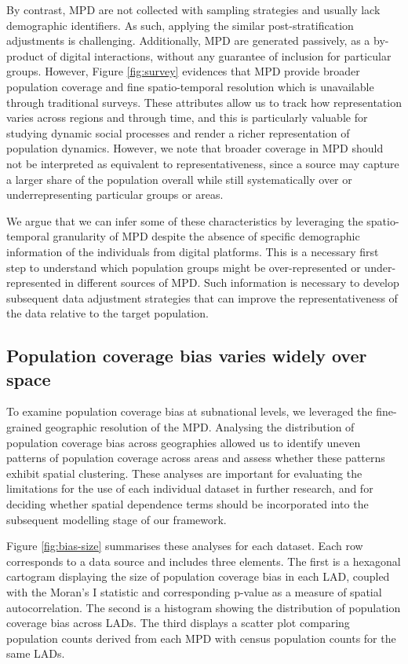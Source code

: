 \documentclass[]{rsos}%
\begin{document}
By contrast, MPD are not collected with sampling strategies and usually
lack demographic identifiers. As such, applying the similar
post-stratification adjustments is challenging. Additionally, MPD are
generated passively, as a by-product of digital interactions, without
any guarantee of inclusion for particular groups. However, Figure
\ref{fig:survey} evidences that MPD provide broader population coverage
and fine spatio-temporal resolution which is unavailable through
traditional surveys. These attributes allow us to track how
representation varies across regions and through time, and this is
particularly valuable for studying dynamic social processes and render a
richer representation of population dynamics. However, we note that
broader coverage in MPD should not be interpreted as equivalent to
representativeness, since a source may capture a larger share of the
population overall while still systematically over or underrepresenting
particular groups or areas.

We argue that we can infer some of these characteristics by leveraging
the spatio-temporal granularity of MPD despite the absence of specific
demographic information of the individuals from digital platforms. This
is a necessary first step to understand which population groups might be
over-represented or under-represented in different sources of MPD. Such
information is necessary to develop subsequent data adjustment
strategies that can improve the representativeness of the data relative
to the target population.

\subsection{Population coverage bias varies widely over space}\label{population-coverage-bias-varies-widely-over-space}

To examine population coverage bias at subnational levels, we leveraged
the fine-grained geographic resolution of the MPD. Analysing the
distribution of population coverage bias across geographies allowed us
to identify uneven patterns of population coverage across areas and
assess whether these patterns exhibit spatial clustering. These analyses
are important for evaluating the limitations for the use of each
individual dataset in further research, and for deciding whether spatial
dependence terms should be incorporated into the subsequent modelling
stage of our framework.

Figure \ref{fig:bias-size} summarises these analyses for each dataset.
Each row corresponds to a data source and includes three elements. The
first is a hexagonal cartogram displaying the size of population
coverage bias in each LAD, coupled with the Moran's I statistic and
corresponding p-value as a measure of spatial autocorrelation. The
second is a histogram showing the distribution of population coverage
bias across LADs. The third displays a scatter plot comparing population
counts derived from each MPD with census population counts for the same
LADs.
\end{document}
